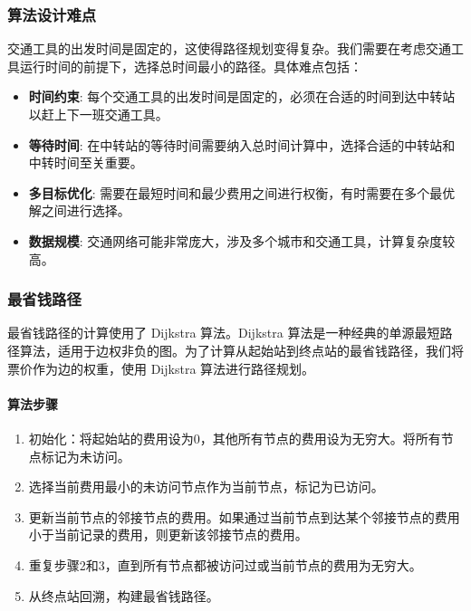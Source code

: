 \documentclass[10pt]{article}
\begin{document}
    \subsubsection{算法设计难点}
    交通工具的出发时间是固定的，这使得路径规划变得复杂。我们需要在考虑交通工具运行时间的前提下，选择总时间最小的路径。具体难点包括：

    \begin{itemize}
        \item \textbf{时间约束}: 每个交通工具的出发时间是固定的，必须在合适的时间到达中转站以赶上下一班交通工具。
        \item \textbf{等待时间}: 在中转站的等待时间需要纳入总时间计算中，选择合适的中转站和中转时间至关重要。
        \item \textbf{多目标优化}: 需要在最短时间和最少费用之间进行权衡，有时需要在多个最优解之间进行选择。
        \item \textbf{数据规模}: 交通网络可能非常庞大，涉及多个城市和交通工具，计算复杂度较高。
    \end{itemize}

    \subsubsection{最省钱路径}

    最省钱路径的计算使用了 Dijkstra 算法。Dijkstra 算法是一种经典的单源最短路径算法，适用于边权非负的图。为了计算从起始站到终点站的最省钱路径，我们将票价作为边的权重，使用 Dijkstra 算法进行路径规划。

    \paragraph{算法步骤}
    \begin{enumerate}
        \item 初始化：将起始站的费用设为0，其他所有节点的费用设为无穷大。将所有节点标记为未访问。
        \item 选择当前费用最小的未访问节点作为当前节点，标记为已访问。
        \item 更新当前节点的邻接节点的费用。如果通过当前节点到达某个邻接节点的费用小于当前记录的费用，则更新该邻接节点的费用。
        \item 重复步骤2和3，直到所有节点都被访问过或当前节点的费用为无穷大。
        \item 从终点站回溯，构建最省钱路径。
    \end{enumerate}
\end{document}
